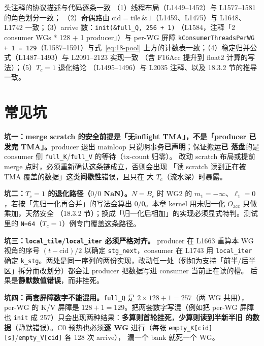 \begin{kaogu}[F1/F3 核校通过]{头注释的协议描述与代码逐条一致}
  （1）线程布局（L1449--1452）与 L1577--1581 的角色划分一致；
  （2）奇偶路由 $\mathrm{cid} = \mathrm{tile}\,\&\,1$（L1459、L1475）与
  L1648、L1742 一致；（3）arrive 数：\texttt{init\allowbreak{}(\&full\_\allowbreak{}Q,\allowbreak{} 256 + 1)}
  （L1584，注释「2 consumer WGs * 128 $+$ 1 producer」）与 per-WG 屏障
  \texttt{k\allowbreak{}Consumer\allowbreak{}Threads\allowbreak{}Per\allowbreak{}WG + 1 =\allowbreak{} 129}（L1587--1591）与式~\ref{eq:18-pool}
  上方的计数表一致；（4）稳定归并公式（L1487--1493）与 L2091--2123 实现一致
  （含 F16Acc 提升到 float2 计算的写法）；（5）$T_c{=}1$ 退化结论
  （L1495--1496）与 L2035 注释、以及 18.3.2 节的推导一致。
\end{kaogu}

\section{常见坑}

\textbf{坑一：merge scratch 的安全前提是「无inflight TMA」，不是「producer 已发完
TMA」。}\allowbreak{}producer 退出 mainloop 只说明事务\textbf{已声明}；保证搬运\textbf{已
落盘}的是 consumer 侧 \texttt{full\_K}/\texttt{full\_V} 的等待（tx-count 归零）。
改动 scratch 布局或提前 merge 点时，必须重新确认这条链成立，否则会出现
「读 scratch 读到正在被 TMA 覆盖的数据」这类\textbf{间歇性}错误，且只在
大 $T_c$（流水深）时暴露。

\textbf{坑二：$T_c = 1$ 的退化路径（$0/0$ NaN）。}$N = B_c$ 时 WG2 的
$m_1 = -\infty$、$\ell_1 = 0$，若按「先归一化再合并」的写法会算出
$0/0$。本章 kernel 用未归一化 $O_{\mathrm{acc}}$ 只做乘加，天然安全
（18.3.2 节）；换成「归一化后相加」的实现必须显式特判。测试里的
\texttt{N=64}（$T_c{=}1$）例专门覆盖这条路径。

\textbf{坑三：\texttt{local\_tile}/\texttt{local\_iter} 必须严格对齐。}
producer 在 L1663 重算本 WG 视角的序号 $(t-\mathrm{cid})/2$ 以确定
\texttt{stg\_next}，consumer 在 L1743 用 \texttt{local\_iter} 确定
\texttt{k\_stg}。两处是同一序列的两份实现，改动任一处（例如为支持「前半/后半
区」拆分而改划分）都会让 producer 把数据写进 consumer 当前正在读的槽。
后果是\textbf{静默数值错误}，而非挂死。

\textbf{坑四：两套屏障数字不能混用。}\texttt{full\_Q} 是
$2 \times 128 + 1 = 257$（两 WG 共用），per-WG 的 K/V 屏障是
$128 + 1 = 129$。把两套数字写混（例如把 per-WG 屏障也 \texttt{init} 成
257）只会出现两种结果：\textbf{多算则首轮挂死}，\textbf{少算则读到半新半旧
的数据}（静默错误）。C0 预热也必须\textbf{逐 WG} 进行（每张
\texttt{empty\_\allowbreak{}K[cid][s]}/\texttt{empty\_\allowbreak{}V[cid]} 各 128 次 arrive），
漏一个 bank 就死一个 WG。

